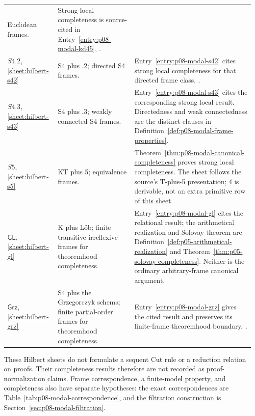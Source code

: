 \begin{longtable}{@{}p{.16\linewidth}p{.29\linewidth}p{.47\linewidth}@{}}
Euclidean frames. & Strong local completeness is source-cited in
Entry~\ref{entry:p08-modal-kd45}, \cite{ChagrovZakharyaschev1997}. \\
\addlinespace
\(S4.2\), \ref{sheet:hilbert-s42} & S4 plus .2; directed S4 frames. &
Entry~\ref{entry:p08-modal-s42} cites strong local completeness for that
directed frame class, \cite{ChagrovZakharyaschev1997}. \\
\addlinespace
\(S4.3\), \ref{sheet:hilbert-s43} & S4 plus .3; weakly connected S4
frames. & Entry~\ref{entry:p08-modal-s43} cites the corresponding strong
local result. Directedness and weak connectedness are the distinct clauses
in Definition~\ref{def:p08-modal-frame-properties}. \\
\addlinespace
\(S5\), \ref{sheet:hilbert-s5} & KT plus 5; equivalence frames. &
Theorem~\ref{thm:p08-modal-canonical-completeness} proves strong local
completeness. The sheet follows the source's T-plus-5 presentation; 4 is
derivable, not an extra primitive row of this sheet. \\
\addlinespace
\(\mathsf{GL}\), \ref{sheet:hilbert-gl} & K plus L\"ob; finite transitive
irreflexive frames for theoremhood completeness. &
Entry~\ref{entry:p08-modal-gl} cites the relational result; the arithmetical
realization and Solovay theorem are
Definition~\ref{def:p05-arithmetical-realization} and
Theorem~\ref{thm:p05-solovay-completeness}. Neither is the ordinary
arbitrary-frame canonical argument. \\
\addlinespace
\(\mathsf{Grz}\), \ref{sheet:hilbert-grz} & S4 plus the Grzegorczyk schema;
finite partial-order frames for theoremhood completeness. &
Entry~\ref{entry:p08-modal-grz} gives the cited result and preserves its
finite-frame theoremhood boundary, \cite{ChagrovZakharyaschev1997}. \\
\bottomrule
\end{longtable}\endgroup

These Hilbert sheets do not formulate a sequent Cut rule or a reduction
relation on proofs.  Their completeness results therefore are not recorded
as proof-normalization claims.  Frame correspondence, a finite-model
property, and completeness also have separate hypotheses: the exact
correspondences are Table~\ref{tab:p08-modal-correspondence}, and the
filtration construction is Section~\ref{sec:p08-modal-filtration}.


